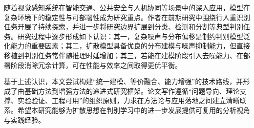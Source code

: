 ﻿\setlength{\baselineskip}{20pt}
\begin{preface}
随着视觉感知系统在智能交通、公共安全与人机协同等场景中的深入应用，模型在复杂环境下的稳定性与可部署性成为研究重点。作者在前期研究中围绕行人重识别任务开展了持续探索，并进一步将研究边界扩展到分类、检测和分割等典型判别任务。研究过程中逐步形成如下认识：其一，复杂噪声与分布偏移是制约判别模型泛化能力的重要因素；其二，扩散模型具备优良的分布建模与噪声抑制能力，但直接移植到判别任务常伴随推理时延增加；其三，若能在建模阶段引入去噪能力、在部署阶段消除冗余计算，可在性能与效率之间取得更优平衡。

基于上述认识，本文尝试构建“统一建模、等价融合、能力增强”的技术路线，并形成了由基础方法到增强方法的递进式研究框架。论文写作遵循“问题导向、理论支撑、实验验证、工程可用”的组织原则，力求在方法论与应用落地之间建立清晰联系。希望本研究能够为扩散思想在判别学习中的进一步发展提供可复用的分析视角与实践经验。
\end{preface}
